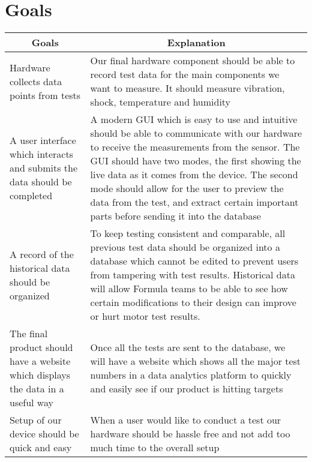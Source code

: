 \documentclass{article}
\begin{document}
\section{Goals}
    \begin{table}[H]
        \centering
        \begin{tabular}{|p{4cm}|p{8cm}|}
        \hline
        \multicolumn{1}{|c|}{\textbf{Goals}} & \multicolumn{1}{c|}{\textbf{Explanation}} 
        \\ \hline
        Hardware collects data points from tests
        & Our final hardware component should be able to record test data for the main components we want to measure. It should measure vibration, shock, temperature and humidity  
        \newline                                
        \\ \hline
        A user interface which interacts and submits the data should be completed                                  
        & A modern GUI which is easy to use and intuitive should be able to communicate with our hardware to receive the measurements from the sensor. The GUI should have two modes, the first showing the live data as it comes from the device. The second mode should allow for the user to preview the data from the test, and extract certain important parts before sending it into the database  
        \newline                                
        \\ \hline
        A record of the historical data should be organized                                
        & To keep testing consistent and comparable, all previous test data should be organized into a database which cannot be edited to prevent users from tampering with test results. Historical data will allow Formula teams to be able to see how certain modifications to their design can improve or hurt motor test results. 
        \newline                                
        \\ \hline
        The final product should have a website which displays the data in a useful way                                
        & Once all the  tests are sent to the database, we will have a website which shows all the major test numbers in a data analytics platform to quickly and easily see if our product is hitting targets  
        \newline                              
        \\ \hline
        Setup of our device should be quick and easy                               
        & When a user would like to conduct a test our hardware should be hassle free and not add too much time to the overall setup
        \newline                            
        \\ \hline
        \end{tabular}
    \end{table}
    
\end{document}
